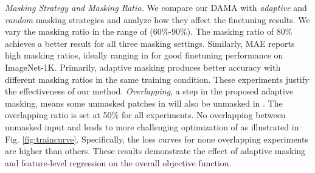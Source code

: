 \documentclass[10pt,twocolumn,letterpaper]{article}
\begin{document}
\textcolor{nblue}{\textit{Masking Strategy and Masking Ratio.}} We compare our DAMA with \textit{adaptive} and \textit{random} masking strategies and analyze how they affect the finetuning results. We vary the masking ratio in the range of (60\%-90\%). The masking ratio of 80\% achieves a better result for all three masking settings. Similarly, MAE reports high masking ratios, ideally ranging in  for good finetuning performance on ImageNet-1K. Primarily, adaptive masking produces better accuracy with different masking ratios in the same training condition. These experiments justify the effectiveness of our method. \textit{Overlapping}, a step in the proposed adaptive masking, means some unmasked patches in  will also be unmasked in . The overlapping ratio is set at 50\% for all experiments. No overlapping between unmasked input  and  leads to more challenging optimization of  as illustrated in Fig. \ref{fig:traincurve}. Specifically, the loss curves for none overlapping experiments are higher than others. These results demonstrate the effect of adaptive masking and feature-level regression on the overall objective function. 
\end{document}
